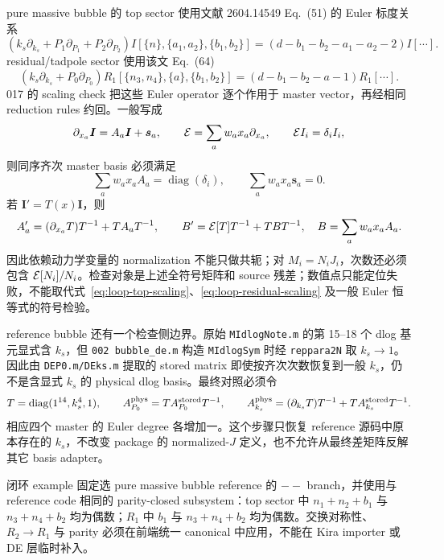﻿\documentclass[a4paper,11pt]{article}
\begin{document}
pure massive bubble 的 top sector 使用文献 2604.14549 Eq.~(51) 的 Euler 标度关系
\begin{equation}
 \left(k_s\partial_{k_s}+P_1\partial_{P_1}+P_2\partial_{P_2}\right)
 I[\{n\},\{a_1,a_2\},\{b_1,b_2\}]
 =\left(d-b_1-b_2-a_1-a_2-2\right)I[\cdots].
 \label{eq:loop-top-scaling}
\end{equation}
residual/tadpole sector 使用该文 Eq.~(64)
\begin{equation}
 \left(k_s\partial_{k_s}+P_0\partial_{P_0}\right)
 R_1[\{n_3,n_4\},\{a\},\{b_1,b_2\}]
 =\left(d-b_1-b_2-a-1\right)R_1[\cdots].
 \label{eq:loop-residual-scaling}
\end{equation}
017 的 scaling check 把这些 Euler operator 逐个作用于 master vector，再经相同 reduction rules 约回。一般写成
\begin{equation}
 \partial_{x_a}\bm I=A_a\bm I+\bm s_a,
 \qquad {\cal E}=\sum_a w_a x_a\partial_{x_a},
 \qquad {\cal E}I_i=\delta_i I_i,
\end{equation}
则同序齐次 master basis 必须满足
\begin{equation}
 \sum_a w_a x_a A_a=\operatorname{diag}(\delta_i),
 \qquad \sum_a w_a x_a\bm s_a=0.
\end{equation}
若 $\bm I'=T(x)\bm I$，则
\begin{equation}
 A'_a=(\partial_{x_a}T)T^{-1}+TA_aT^{-1},\qquad
 B'={\cal E}[T]T^{-1}+TBT^{-1},
 \quad B=\sum_a w_a x_aA_a.
\end{equation}
因此依赖动力学变量的 normalization 不能只做共轭；对 $M_i=N_iJ_i$，次数还必须包含 ${\cal E}[N_i]/N_i$。检查对象是上述全符号矩阵和 source 残差；数值点只能定位失败，不能取代式~\eqref{eq:loop-top-scaling}、\eqref{eq:loop-residual-scaling} 及一般 Euler 恒等式的符号检验。

reference bubble 还有一个检查侧边界。原始 \texttt{MIdlogNote.m} 的第 15--18 个 dlog 基元显式含 $k_s$，但 \texttt{002 bubble\_de.m} 构造 \texttt{MIdlogSym} 时经 \texttt{reppara2N} 取 $k_s\to1$。因此由 \texttt{DEP0.m/DEks.m} 提取的 stored matrix 即使按齐次次数恢复到一般 $k_s$，仍不是含显式 $k_s$ 的 physical dlog basis。最终对照必须令
\[
 T=\operatorname{diag}(1^{14},k_s^4,1),\qquad
 A^{\rm phys}_{P_0}=T A^{\rm stored}_{P_0}T^{-1},\qquad
 A^{\rm phys}_{k_s}=(\partial_{k_s}T)T^{-1}+T A^{\rm stored}_{k_s}T^{-1}.
\]
相应四个 master 的 Euler degree 各增加一。这个步骤只恢复 reference 源码中原本存在的 $k_s$，不改变 package 的 normalized-$J$ 定义，也不允许从最终差矩阵反解其它 basis adapter。

闭环 example 固定选 pure massive bubble reference 的 $--$ branch，并使用与 reference code 相同的 parity-closed subsystem：top sector 中 $n_1+n_2+b_1$ 与 $n_3+n_4+b_2$ 均为偶数；$R_1$ 中 $b_1$ 与 $n_3+n_4+b_2$ 均为偶数。交换对称性、$R_2\to R_1$ 与 parity 必须在前端统一 canonical 中应用，不能在 Kira importer 或 DE 层临时补入。
\end{document}
